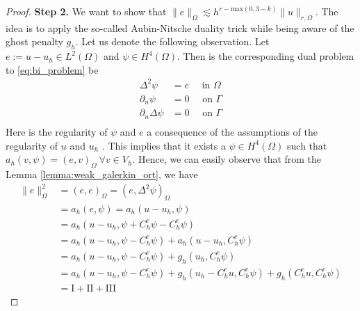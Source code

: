 \documentclass[11pt]{article}
\theoremstyle{remark}
\numberwithin{equation}{section}
\begin{document}
\begin{proof}
        \textbf{Step 2.}
        We want to show that $ \| e \|_{ \Omega  }^{  } \lesssim   h^{r- \mathrm{max}(0,3-k)} \| u \|_{ r ,\Omega  }^{  }$. The idea is to apply the so-called Aubin-Nitsche duality trick while being aware of the ghost penalty $g_{h}$. Let us denote the following
        observation.
        Let $e:= u -u_{h} \in L^{2}( \Omega ) $ and $\psi  \in H^{4}( \Omega ) $.
        Then is the corresponding dual problem to \eqref{eq:bi_problem} be
        \begin{equation}
            \begin{split}
            \Delta ^2 \psi &= e  \quad  \text{ in } \Omega  \\
            \partial _{n} \psi &= 0 \quad \text{ on } \Gamma \\
            \partial _{n} \Delta \psi & = 0 \quad  \text{ on } \Gamma   \\
            \end{split}
        \end{equation}
 Here is the regularity of $\psi $ and $e$ a consequence of the assumptions of the regularity of $u$ and $u_{h}$  \cite[pp. 113]{brenner2012}.
        This implies that it exists a $\psi \in H^{4}( \Omega ) $ such that $a_{h}(v, \psi ) = ( e,v)_{\Omega } \ \forall v \in V_{h}  $. Hence, we can easily observe that from the Lemma \ref{lemma:weak_galerkin_ort}, we have
        \begin{equation}
            \label{eq:ni_1}
            \begin{split}
        \| e \|_{ \Omega  }^{ 2 }  & = ( e,e)_\Omega   = ( e, \Delta ^2 \psi )_{\Omega } \\
        &= a_{h}( e, \psi  ) = a_{h}( u-u_h, \psi ) \\
        &= a_{h}( u-u_h, \psi + C^{e}_{h}\psi  - C^{e}_{h}\psi )  \\
        &= a_{h}( u-u_h, \psi   - C^{e}_{h}\psi ) +  a_{h}( u-u_h, C^{e}_{h}\psi )  \\
        &= a_{h}( u-u_h, \psi  - C^{e}_{h}\psi ) +  g_{h}( u_h, C^{e}_{h}\psi ) \\
        &= a_{h}( u-u_h, \psi  - C^{e}_{h}\psi ) +  g_{h}( u_h - C^{e}_{h}u, C^{e}_{h}\psi )+  g_{h}( C^{e}_{h}u, C^{e}_{h}\psi ) \\
        &  = \mathrm{I} + \mathrm{II} + \mathrm{III}
            \end{split}
        \end{equation}


\end{proof}
\end{document}
